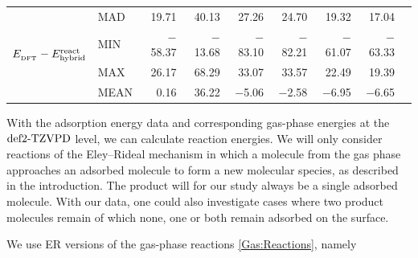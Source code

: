 \begin{table}[t!]
\begin{adjustbox}{width=1.0\textwidth,center}
\begin{tabular}{lll|rrrrrr|r}
    \hline \hline
\multicolumn{2}{r|}{\multirow{4}{*}{$E_{_{\text{DFT}}} - E^{\text{react}}_{\text{hybrid}}$}} &
                            MAD   & 19.71 & 40.13 & 27.26 & 24.70 & 19.32 & 17.04 &  \\
    \multicolumn{2}{r|}{} &  MIN   & $-$58.37 & $-$13.68 & $-$83.10 & $-$82.21 & $-$61.07 & $-$63.33 &  \\
    \multicolumn{2}{r|}{} &  MAX   & 26.17 & 68.29 & 33.07 & 33.57 & 22.49 & 19.39 &  \\
    \multicolumn{2}{r|}{} &  MEAN  & 0.16  & 36.22 & $-$5.06 & $-$2.58 & $-$6.95 & $-$6.65 &  \\[5pt]
%
%
    \end{tabular}%
  \label{Tab:Ads:React}%
    \end{adjustbox}
\end{table}%


With the adsorption energy data and corresponding gas-phase energies at the
$\text{def2-TZVPD}$ level, we can calculate reaction energies. We will only
consider reactions of the Eley--Rideal mechanism in which a molecule
from the gas phase approaches an adsorbed molecule to form
a new molecular species, as described in the introduction.
The product will for our study always be a single adsorbed molecule. With our data,
one could also investigate cases where two product molecules remain
of which none, one or both remain adsorbed on the surface.

We use ER versions of the gas-phase reactions \eqref{Gas:Reactions}, namely

